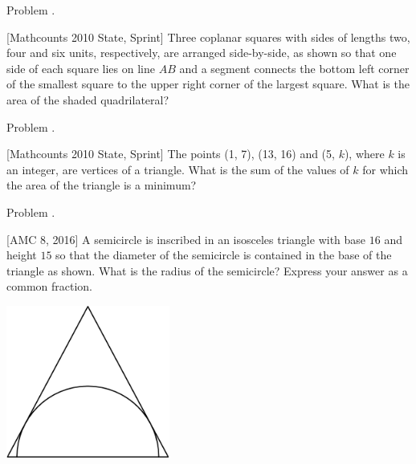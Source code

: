 \documentclass[9pt]{beamer}
\newcounter{problem}[section]
\begin{document}
\begin{frame}[t, fragile]{Problem \thesection.\theproblem}
    \begin{block}{}[Mathcounts 2010 State, Sprint]
    Three coplanar squares with sides of lengths two, four and six units, respectively, are arranged side-by-side, as shown so that one side of each square lies on line $AB$ and a segment connects the bottom left corner of the smallest square to the upper right corner of the largest square. What is the area of the shaded quadrilateral?

    
    \end{block}
    \begin{center}
    \end{center}
\end{frame}


\begin{frame}[t, fragile]{Problem \thesection.\theproblem}
    \begin{block}{}[Mathcounts 2010 State, Sprint]
    The points (1, 7), (13, 16) and (5, $k$), where $k$ is an integer, are vertices of a triangle. What is the sum of the values of $k$ for which the area of the triangle is a minimum?
	
    \end{block}
\end{frame}

\begin{frame}[t, fragile]{Problem \thesection.\theproblem}
    \begin{block}{}[AMC 8, 2016]
    A semicircle is inscribed in an isosceles triangle with base $16$ and height $15$ so that the diameter of the semicircle is contained in the base of the triangle as shown. What is the radius of the semicircle? Express your answer as a common fraction.

	
    \end{block}
    \begin{center}
        \includegraphics[height=50mm,scale=0.25]{images/2016AMC8.png}
    \end{center}
\end{frame}
\end{document}
